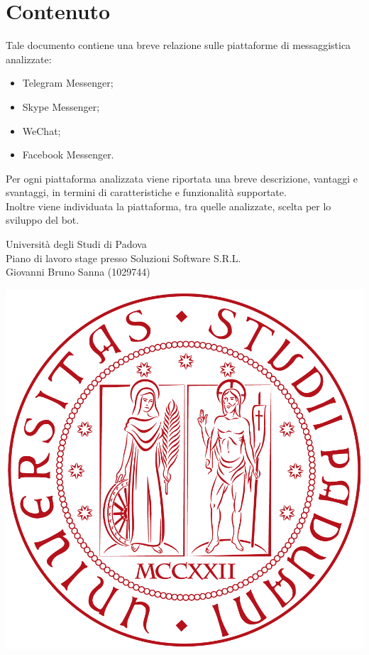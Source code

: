 \documentclass[11pt,notitlepage]{article}
\newcommand{\nomeStudente}{Giovanni Bruno}
\newcommand{\cognomeStudente}{Sanna}
\newcommand{\matricolaStudente}{1029744}
\newcommand{\ragioneSocAzienda}{Soluzioni Software S.R.L.}
\begin{document}
\section*{Contenuto}
Tale documento contiene una breve relazione sulle piattaforme di messaggistica analizzate:
\begin{itemize}
		\item Telegram Messenger; 
		\item Skype Messenger; 
		\item WeChat;
		\item Facebook Messenger. 
	\end{itemize} 
	Per ogni piattaforma analizzata viene riportata una breve descrizione, vantaggi e svantaggi, in termini di caratteristiche e funzionalità supportate. \\
	Inoltre viene individuata la piattaforma, tra quelle analizzate, scelta per lo sviluppo del bot.


\newpage



\noindent
\parbox{0.7\columnwidth}{Università degli Studi di Padova\\
	Piano di lavoro stage presso \ragioneSocAzienda{}\\
	\nomeStudente{} \cognomeStudente{} (\matricolaStudente{})}%
\parbox{0.3\columnwidth}{
	\hfill \includegraphics[scale=0.08]{immagini/logo-unipd.png}}
\end{document}
